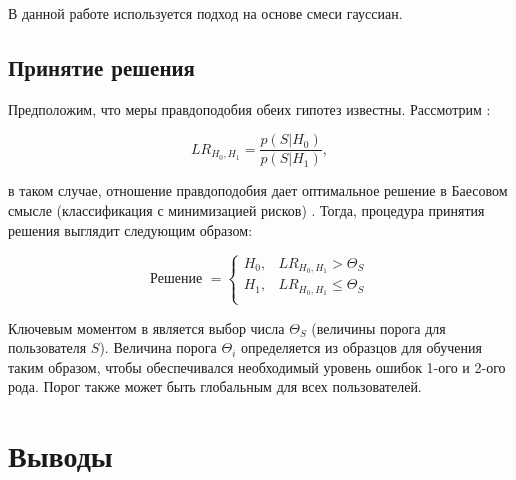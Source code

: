 В данной работе используется подход на основе смеси гауссиан.

\subsection{Принятие решения}

Предположим, что меры правдоподобия обеих гипотез  известны. Рассмотрим :

\begin{equation}
\label{eq:lr}
LR_{H_0, H_1} = \frac{p(S|H_0)}{p(S|H_1)},
\end{equation}

\noindent в таком случае, отношение правдоподобия дает оптимальное решение в Баесовом смысле (классификация с минимизацией рисков) \cite{Fukunaga90Intro}. Тогда, процедура принятия решения выглядит следующим образом:

\begin{equation}
\label{eq:decision}
\textrm{Решение } = \left\{ 
    \begin{array}{ll}
        H_0, & LR_{H_0, H_1} > \Theta_{S} \\
        H_1, & LR_{H_0, H_1} \leq \Theta_{S} \\
    \end{array}
\right.
\end{equation}

Ключевым моментом в  является выбор числа $\Theta_{S}$ (величины порога для пользователя $S$). Величина порога $\Theta_i$ определяется из образцов для обучения таким образом, чтобы обеспечивался необходимый уровень ошибок 1-ого и 2-ого рода. Порог также может быть глобальным для всех пользователей.

\section{Выводы}
